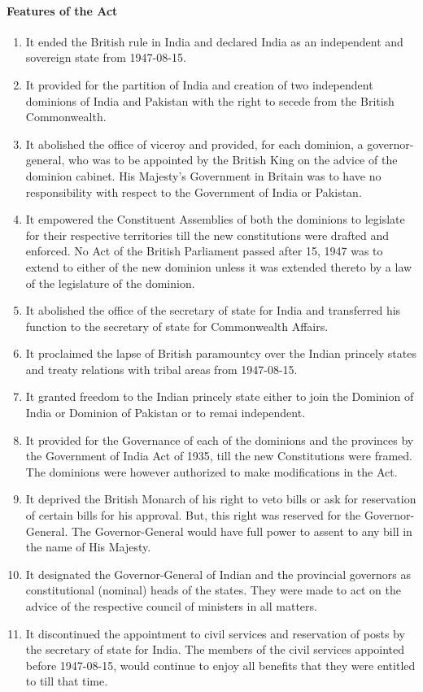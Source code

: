 \begin{multicols}{2}
\paragraph{Features of the Act}
\begin{enumerate}
  \item It ended the British rule in India and declared India as an independent and sovereign state from 1947-08-15.
  \item It provided for the partition of India and creation of two independent dominions of India and Pakistan with the right to secede from the British Commonwealth.
  \item It abolished the office of viceroy and provided, for each dominion, a governor-general, who was to be appointed by the British King on the advice of the dominion cabinet. His Majesty's Government in Britain was to have no responsibility with respect to the Government of India or Pakistan.
  \item It empowered the Constituent Assemblies of both the dominions to legislate for their respective territories till the new constitutions were drafted and enforced. No Act of the British Parliament passed after 15, 1947 was to extend to either of the new dominion unless it was extended thereto by a law of the legislature of the dominion.
  \item It abolished the office of the secretary of state for India and transferred his function to the secretary of state for Commonwealth Affairs.
  \item It proclaimed the lapse of British paramountcy over the Indian princely states and treaty relations with tribal areas from 1947-08-15.
  \item It granted freedom to the Indian princely state either to join the Dominion of India or Dominion of Pakistan or to remai independent.
  \item It provided for the Governance of each of the dominions and the provinces by the Government of India Act of 1935, till the new Constitutions were framed. The dominions were however authorized to make modifications in the Act.
  \item It deprived the British Monarch of his right to veto bills or ask for reservation of certain bills for his approval. But, this right was reserved for the Governor-General. The Governor-General would have full power to assent to any bill in the name of His Majesty.
  \item It designated the Governor-General of Indian and the provincial governors as constitutional (nominal) heads of the states. They were made to act on the advice of the respective council of ministers in all matters.
  \item It discontinued the appointment to civil services and reservation of posts by the secretary of state for India. The members of the civil services appointed before 1947-08-15, would continue to enjoy all benefits that they were entitled to till that time.
\end{enumerate}


\end{multicols}
